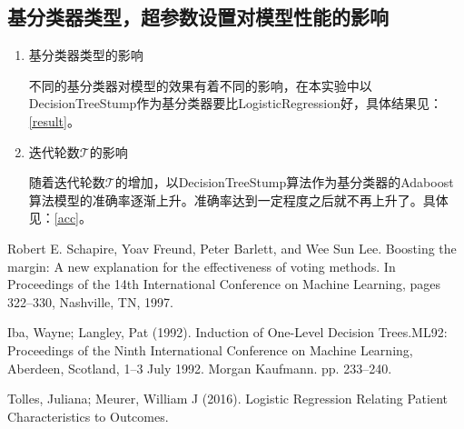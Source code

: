 \documentclass{paper}
\begin{document}
\subsection{基分类器类型，超参数设置对模型性能的影响}

\begin{enumerate}

    \item 基分类器类型的影响
            
            不同的基分类器对模型的效果有着不同的影响，在本实验中以DecisionTreeStump作为基分类器要比LogisticRegression好，具体结果见：\ref{result}。
    
    \item 迭代轮数$\mathcal{T}$的影响

            随着迭代轮数$\mathcal{T}$的增加，以DecisionTreeStump算法作为基分类器的Adaboost算法模型的准确率逐渐上升。准确率达到一定程度之后就不再上升了。具体见：\ref{acc}。

\end{enumerate}



\begin{thebibliography}{99}  

    Robert E. Schapire, Yoav Freund, Peter Barlett, and Wee Sun Lee. Boosting the margin: A new explanation for the effectiveness of voting methods. In Proceedings of the 14th International Conference on
    Machine Learning, pages 322–330, Nashville, TN, 1997.

    Iba, Wayne; Langley, Pat (1992). Induction of One-Level Decision Trees.ML92: Proceedings of the Ninth International Conference on Machine Learning, Aberdeen, Scotland, 1–3 July 1992. Morgan Kaufmann. pp. 233–240.

    Tolles, Juliana; Meurer, William J (2016). Logistic Regression Relating Patient Characteristics to Outcomes.
    
\end{thebibliography}
\end{document}
